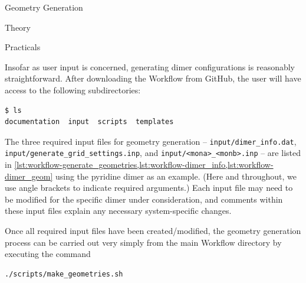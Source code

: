 \begin{section}{Geometry Generation}
\begin{subsection}{Theory}
\end{subsection}
\begin{subsection}{Practicals}

Insofar as user input is concerned, generating dimer configurations is
reasonably straightforward.
After downloading the Workflow from GitHub, 
the user will have access to the following subdirectories:
\begin{lstlisting}[language=bash]
$ ls
documentation  input  scripts  templates
\end{lstlisting}
The three required input files for geometry generation -- \verb|input/dimer_info.dat|,
\verb|input/generate_grid_settings.inp|, and \verb|input/<mona>_<monb>.inp| --
are
listed  in
\cref{lst:workflow-generate_geometries,lst:workflow-dimer_info,lst:workflow-dimer_geom}
using the pyridine dimer as an example.
(Here and throughout, we use angle brackets to indicate required arguments.)
Each input file may need to be modified for the specific dimer under consideration, and
comments within these input files explain any necessary system-specific changes.

Once all required input files have been created/modified, the geometry generation process can
be carried out very simply from the main Workflow directory by
executing the command
%
\begin{lstlisting}
./scripts/make_geometries.sh
\end{lstlisting}

\end{subsection}


\end{section}
